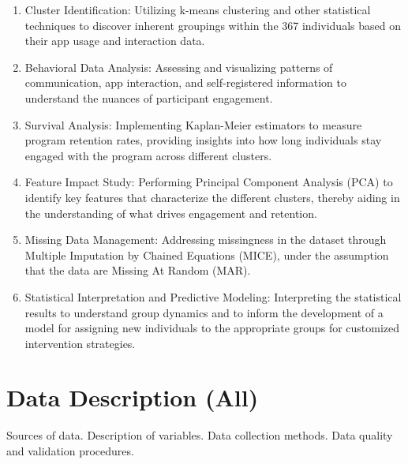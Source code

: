 \documentclass[12pt]{article}
\begin{document}
\begin{enumerate}
  \item Cluster Identification: Utilizing k-means clustering and other statistical techniques to discover inherent groupings within the 367 individuals based on their app usage and interaction data.

  \item Behavioral Data Analysis: Assessing and visualizing patterns of communication, app interaction, and self-registered information to understand the nuances of participant engagement.

  \item Survival Analysis: Implementing Kaplan-Meier estimators to measure program retention rates, providing insights into how long individuals stay engaged with the program across different clusters.

  \item Feature Impact Study: Performing Principal Component Analysis (PCA) to identify key features that characterize the different clusters, thereby aiding in the understanding of what drives engagement and retention.

  \item Missing Data Management: Addressing missingness in the dataset through Multiple Imputation by Chained Equations (MICE), under the assumption that the data are Missing At Random (MAR).

  \item Statistical Interpretation and Predictive Modeling: Interpreting the statistical results to understand group dynamics and to inform the development of a model for assigning new individuals to the appropriate groups for customized intervention strategies.
\end{enumerate}



\section{Data Description (All)}

\label{s.data_desc}

Sources of data.
Description of variables.
Data collection methods.
Data quality and validation procedures.
\end{document}
